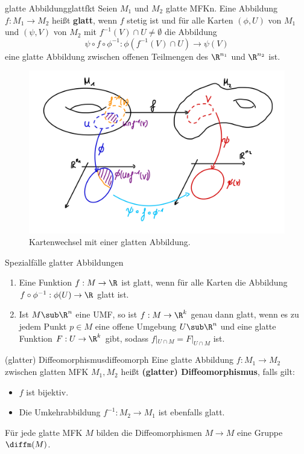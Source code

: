 \begin{definition}{glatte Abbildung}{glattfkt}
Seien $M_1$ und $M_2$ glatte MFKn. Eine Abbildung $f: M_1 \to M_2$ heißt \textbf{glatt}, wenn $f$ stetig ist und für alle Karten $(\phi, U)$ von $M_1$ und $(\psi, V)$ von $M_2$ mit $f^{-1}(V) \cap U \neq \emptyset$ die Abbildung
\begin{equation}
\psi \circ f \circ \phi^{-1}: \phi(f^{-1}(V) \cap U) \to \psi (V)
\end{equation}
eine glatte Abbildung zwischen offenen Teilmengen des $\R^{n_1}$ und $\R^{n_2}$ ist.
\begin{figure}[H]
\label{fig:sphere}
\centering
\includegraphics[width=0.3\linewidth]{Bilder/glatteabb.png}
\caption{Kartenwechsel mit einer glatten Abbildung.}
\end{figure}
\end{definition}
\begin{bemerkungen}Spezialfälle glatter Abbildungen\\
\begin{enumerate}
\item Eine Funktion $f: M \to \R$ ist glatt, wenn für alle Karten die Abbildung $f \circ \phi^{-1}: \phi(U) \to \R$ glatt ist.
\item Ist $M \sub \R^n$ eine UMF, so ist $f: M \to \R^k$ genau dann glatt, wenn es zu jedem Punkt $p \in M$ eine offene Umgebung $U \sub \R^n$ und eine glatte Funktion $F: U \to \R^k$ gibt, sodass $f|_{U \cap M} = F|_{U \cap M}$ ist.
\end{enumerate}
\end{bemerkungen}
\begin{definition}{(glatter) Diffeomorphismus}{diffeomorph}
Eine glatte Abbildung $f: M_1 \to M_2$ zwischen glatten MFK $M_1, M_2$ heißt \textbf{(glatter) Diffeomorphismus}, falls gilt:
\begin{itemize}
\item $f$ ist bijektiv.
\item Die Umkehrabbildung $f^{-1}: M_2 \to M_1$ ist ebenfalls glatt.
\end{itemize}
\end{definition}
Für jede glatte MFK $M$ bilden die Diffeomorphismen $M \to M$ eine Gruppe $\diffm (M)$.
